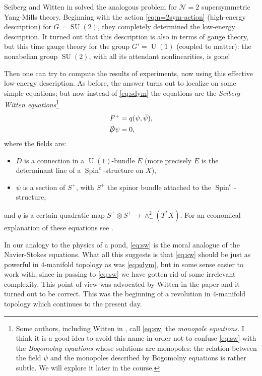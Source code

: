 \documentclass[12pt,letterpaper,reqno]{article}
\numberwithin{equation}{section}
\newcommand{\cN}{\ensuremath{\mathcal N}}
\newcommand{\ti}[1]{\textit{#1}}
\DeclareMathOperator{\Spin}{Spin}
\DeclareMathOperator{\SU}{SU}
\DeclareMathOperator{\U}{U}
\begin{document}
Seiberg and Witten in \cite{Seiberg:1994rs}
solved the analogous problem for $\cN=2$
supersymmetric Yang-Mills theory. Beginning with the action
\eqref{eq:n=2sym-action} (high-energy description) for $G = \SU(2)$,
they completely determined the low-energy description.
It turned out that this description is also in terms of gauge theory,
but this time gauge theory for the group $G' = \U(1)$ (coupled to matter):
the nonabelian group $\SU(2)$, with all its attendant
nonlinearities, is gone!

Then one can try to compute the results of experiments, now using this
effective low-energy description.
As before, the answer turns out to localize on some simple equations;
but now instead of \eqref{eq:sdym} the equations are
the \ti{Seiberg-Witten equations}\footnote{Some authors, including Witten in \cite{Witten:1994cg},
call \eqref{eq:sw} the \ti{monopole equations}. I think it is a good idea to avoid this name in order
not to confuse \eqref{eq:sw} with the \ti{Bogomolny equations} whose solutions are
monopoles: the relation between the field $\psi$ and the monopoles described by
Bogomolny equations is rather subtle. We will explore it later in the course.}
\begin{subequations} \label{eq:sw}
\begin{align}
  F^+ &= q(\psi, \bar\psi), \\
  \slashed{D} \psi &= 0,
\end{align}
\end{subequations}
where the fields are:
\begin{itemize}
\item $D$ is a connection in a $\U(1)$-bundle $E$
(more precisely $E$ is the determinant line of a $\Spin^c$-structure on $X$),
\item $\psi$ is a section of $S^+$, with $S^+$ the spinor bundle
attached to the $\Spin^c$-structure,
\end{itemize}
and $q$ is a certain
quadratic map $S^+ \otimes S^+ \to \wedge^2_+(T^* X)$.
For an economical explanation of these equations see
\cite{MR1367507}.

In our analogy to the physics of a pond,
\eqref{eq:sw} is the moral analogue
of the Navier-Stokes equations.
What all this suggests is that \eqref{eq:sw} should be
just as powerful in $4$-manifold topology as was
\eqref{eq:sdym}, but in some sense easier to work with,
since in passing to \eqref{eq:sw} we have gotten rid
of some irrelevant complexity. This point of view was
advocated by Witten in the paper \cite{Witten:1994cg}
and it turned out to be correct.
This was the
beginning of a revolution in $4$-manifold topology which continues
to the present day.
\end{document}
